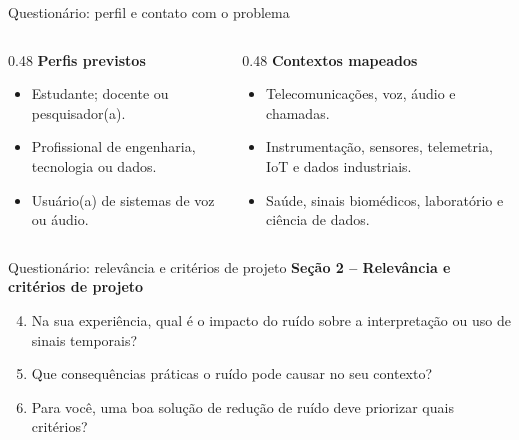 \documentclass[aspectratio=1610,11pt]{beamer}
\begin{document}
{\begin{frame}[noframenumbering]{Questionário: perfil e contato com o problema}
    \vspace{0.2cm}
    \begin{columns}[T,onlytextwidth]
        \begin{column}{0.48\textwidth}
            \textbf{Perfis previstos}
            \begin{itemize}
                \item Estudante; docente ou pesquisador(a).
                \item Profissional de engenharia, tecnologia ou dados.
                \item Usuário(a) de sistemas de voz ou áudio.
            \end{itemize}
        \end{column}
        \begin{column}{0.48\textwidth}
            \textbf{Contextos mapeados}
            \begin{itemize}
                \item Telecomunicações, voz, áudio e chamadas.
                \item Instrumentação, sensores, telemetria, IoT e dados industriais.
                \item Saúde, sinais biomédicos, laboratório e ciência de dados.
            \end{itemize}
        \end{column}
    \end{columns}
\end{frame}

\begin{frame}[noframenumbering]{Questionário: relevância e critérios de projeto}
    \footnotesize
    \textbf{Seção 2 -- Relevância e critérios de projeto}
    \begin{enumerate}
        \setcounter{enumi}{3}
        \item Na sua experiência, qual é o impacto do ruído sobre a interpretação ou uso de sinais temporais?
        \item Que consequências práticas o ruído pode causar no seu contexto?
        \item Para você, uma boa solução de redução de ruído deve priorizar quais critérios?
    \end{enumerate}


\end{frame}}
\end{document}
